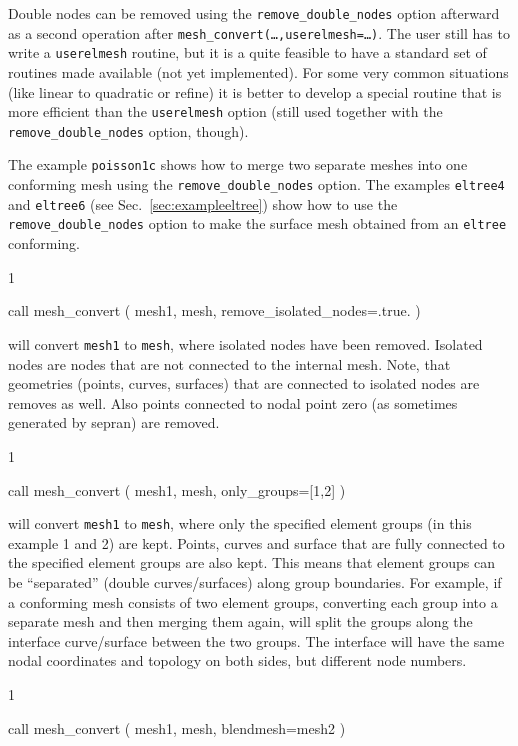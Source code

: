 Double nodes can be removed using the \texttt{remove\_double\_nodes}
option afterward as a second operation after
\texttt{mesh\_convert(\ldots,userelmesh=\ldots)}.
  The user still has to write a \texttt{userelmesh}
 routine, but it is a quite feasible 
  to have a standard set of routines made available (not yet implemented).
  For some very common situations (like linear to quadratic or refine) it is
  better to develop a special routine that is more efficient than the 
  \texttt{userelmesh} option (still used together with the
  \texttt{remove\_double\_nodes} option, though).

The example \texttt{poisson1c} shows how to merge two separate meshes into one
conforming mesh using the \texttt{remove\_double\_nodes} option.
The examples \texttt{eltree4} 
and \texttt{eltree6} (see Sec.~\ref{sec:exampleeltree}) show how to
use the \texttt{remove\_double\_nodes} option to make the surface mesh obtained
from an \texttt{eltree} conforming. 
\begin{listing}{1}

  call mesh_convert ( mesh1, mesh, remove_isolated_nodes=.true. )

\end{listing}
will convert \texttt{mesh1} to \texttt{mesh}, where isolated
nodes have been removed. Isolated nodes are nodes that are not connected
to the internal mesh.
Note, that geometries (points, curves, surfaces) that are connected to
isolated nodes are removes as well.
Also points connected to nodal point zero (as sometimes generated by sepran)
are removed.
\begin{listing}{1}

  call mesh_convert ( mesh1, mesh, only_groups=[1,2] )

\end{listing}
will convert \texttt{mesh1} to \texttt{mesh}, where only the specified
element groups (in this example 1 and 2)
are kept. Points, curves and surface that are fully connected to the specified
element groups are also kept. This means that element groups can be ``separated''
(double curves/surfaces) along group boundaries. For example, if a conforming mesh consists of two element
groups, converting each group into a separate mesh and then merging them
again, will split the groups along the interface curve/surface between the
two groups. The interface will have the same nodal coordinates and topology
on both sides, but different node numbers.
\begin{listing}{1}

  call mesh_convert ( mesh1, mesh, blendmesh=mesh2 )

\end{listing}
